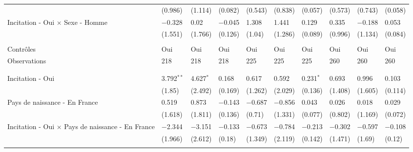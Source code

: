 \documentclass[
]{book}
\begin{document}
\begin{landscape}
\begin{ThreePartTable}
\begin{longtable}[t]{llllllllll}
\hspace{1em} & (0.986) & (1.114) & (0.082) & (0.543) & (0.838) & (0.057) & (0.573) & (0.743) & (0.058)\\
\hspace{1em}Incitation - Oui $\times$ Sexe - Homme & $-$0.328 & 0.02 & $-$0.045 & 1.308 & 1.441 & 0.129 & 0.335 & $-$0.188 & 0.053\\
\hspace{1em} & (1.551) & (1.766) & (0.126) & (1.04) & (1.286) & (0.089) & (0.996) & (1.134) & (0.084)\\
\hspace{1em} &  &  &  &  &  &  &  &  \vphantom{4} & \\
\hspace{1em}Contrôles & Oui & Oui & Oui & Oui & Oui & Oui & Oui & Oui & \vphantom{2} Oui\\
\hspace{1em}Observations & 218 & 218 & 218 & 225 & 225 & 225 & 260 & 260 & \vphantom{2} 260\\
\hspace{1em} &  &  &  &  &  &  &  &  \vphantom{3} & \\
\addlinespace[0.3em]
\multicolumn{10}{l}{\textbf{Panel E : Hétérogénéité en fonction du pays de naissance}}\\
\hline
\hspace{1em}Incitation - Oui & 3.792$^{**}$ & 4.627$^{*}$ & 0.168 & 0.617 & 0.592 & 0.231$^{*}$ & 0.693 & 0.996 & 0.103\\
\hspace{1em} & (1.85) & (2.492) & (0.169) & (1.262) & (2.029) & (0.136) & (1.408) & (1.605) & (0.114)\\
\hspace{1em}Pays de naissance - En France & 0.519 & 0.873 & $-$0.143 & $-$0.687 & $-$0.856 & 0.043 & 0.026 & 0.018 & 0.029\\
\hspace{1em} & (1.618) & (1.811) & (0.136) & (0.71) & (1.331) & (0.077) & (0.802) & (1.169) & (0.072)\\
\hspace{1em}Incitation - Oui $\times$ Pays de naissance - En France & $-$2.344 & $-$3.151 & $-$0.133 & $-$0.673 & $-$0.784 & $-$0.213 & $-$0.302 & $-$0.597 & $-$0.108\\
\hspace{1em} & (1.966) & (2.612) & (0.18) & (1.349) & (2.119) & (0.142) & (1.471) & (1.69) & (0.12)\\
\hspace{1em} &  &  &  &  &  &  &  &  \vphantom{2} & \\

\end{longtable}
\end{ThreePartTable}
\end{landscape}
\end{document}
